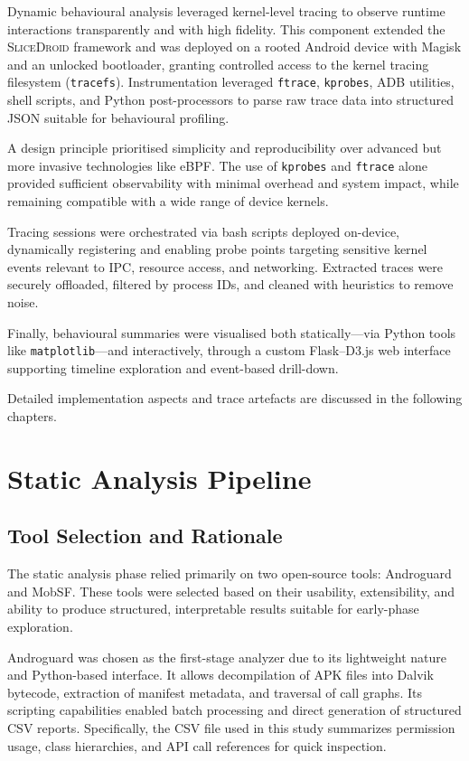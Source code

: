 \documentclass[a4paper,12pt]{report}
\begin{document}
Dynamic behavioural analysis leveraged kernel-level tracing to observe runtime interactions transparently and with high fidelity. This component extended the \textsc{SliceDroid} framework and was deployed on a rooted Android device with Magisk and an unlocked bootloader, granting controlled access to the kernel tracing filesystem (\texttt{tracefs}). Instrumentation leveraged \texttt{ftrace}, \texttt{kprobes}, ADB utilities, shell scripts, and Python post-processors to parse raw trace data into structured JSON suitable for behavioural profiling.

A design principle prioritised simplicity and reproducibility over advanced but more invasive technologies like eBPF. The use of \texttt{kprobes} and \texttt{ftrace} alone provided sufficient observability with minimal overhead and system impact, while remaining compatible with a wide range of device kernels.

Tracing sessions were orchestrated via bash scripts deployed on-device, dynamically registering and enabling probe points targeting sensitive kernel events relevant to IPC, resource access, and networking. Extracted traces were securely offloaded, filtered by process IDs, and cleaned with heuristics to remove noise.

Finally, behavioural summaries were visualised both statically—via Python tools like \texttt{matplotlib}—and interactively, through a custom Flask–D3.js web interface supporting timeline exploration and event-based drill-down.

Detailed implementation aspects and trace artefacts are discussed in the following chapters.

\section{Static Analysis Pipeline}

\subsection{Tool Selection and Rationale}

The static analysis phase relied primarily on two open-source tools: Androguard and MobSF. These tools were selected based on their usability, extensibility, and ability to produce structured, interpretable results suitable for early-phase exploration.

Androguard was chosen as the first-stage analyzer due to its lightweight nature and Python-based interface. It allows decompilation of APK files into Dalvik bytecode, extraction of manifest metadata, and traversal of call graphs. Its scripting capabilities enabled batch processing and direct generation of structured CSV reports. Specifically, the CSV file used in this study summarizes permission usage, class hierarchies, and API call references for quick inspection.
\end{document}
